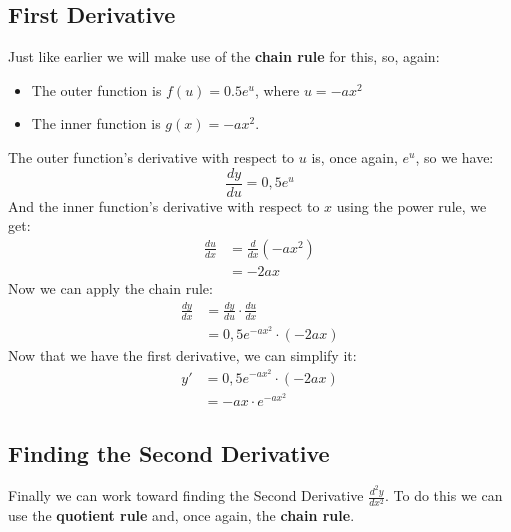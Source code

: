 \documentclass[a4paper,12pt]{article}
\begin{document}
\subsection{First Derivative}
Just like earlier we will make use of the \textbf{chain rule} 
for this, so, again:
\begin{itemize}
    \item The outer function is $f(u) = 0.5e^u$, where $u = -ax^2$ %
    \item The inner function is $g(x) = -ax^2$.
\end{itemize}
The outer function's derivative with respect to $u$ is, once again, $e^u$, 
so we have:
\begin{equation}
    \frac{dy}{du} = 0,5e^u %
\end{equation}
And the inner function's derivative with respect to $x$ using the power rule, 
we get:
\begin{equation}
    \begin{split} %
      \frac{du}{dx} &= \frac{d}{dx}\left(-ax^2\right) \\ %
                    &= -2ax %
    \end{split}
\end{equation}
Now we can apply the chain rule:
\begin{equation}
    \begin{split} %
      \frac{dy}{dx} &= \frac{dy}{du} \cdot \frac{du}{dx} \\ %
                    &= 0,5e^{-ax^2} \cdot \left(-2ax\right) %
    \end{split}
\end{equation}
Now that we have the first derivative, we can simplify it:
\begin{displaymath}
    \begin{split} %
      y'  &= 0,5e^{-ax^2} \cdot \left(-2ax\right) \\ %
          &= -ax \cdot e^{-ax^2} %
    \end{split}
\end{displaymath}
\subsection{Finding the Second Derivative}
Finally we can work toward finding the Second Derivative $\frac{d^2y}{dx^2}$. 
To do this we can use the \textbf{quotient rule} and, once again, 
the \textbf{chain rule}.
\end{document}
